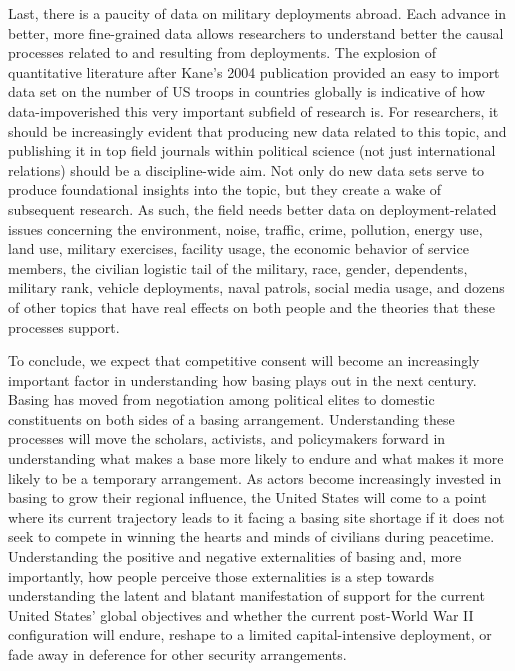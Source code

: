 Last, there is a paucity of data on military deployments abroad. Each advance in better, more fine-grained data allows researchers to understand better the causal processes related to and resulting from deployments. The explosion of quantitative literature after Kane's 2004 publication provided an easy to import data set on the number of US troops in countries globally is indicative of how data-impoverished this very important subfield of research is.\cite{Kane2004} For researchers, it should be increasingly evident that producing new data related to this topic, and publishing it in top field journals within political science (not just international relations) should be a discipline-wide aim. Not only do new data sets serve to produce foundational insights into the topic, but they create a wake of subsequent research. As such, the field needs better data on deployment-related issues concerning the environment, noise, traffic, crime, pollution, energy use, land use, military exercises, facility usage, the economic behavior of service members, the civilian logistic tail of the military, race, gender, dependents, military rank, vehicle deployments, naval patrols, social media usage, and dozens of other topics that have real effects on both people and the theories that these processes support. 



To conclude, we expect that competitive consent will become an increasingly important factor in understanding how basing plays out in the next century. Basing has moved from negotiation among political elites to domestic constituents on both sides of a basing arrangement. Understanding these processes will move the scholars, activists, and policymakers forward in understanding what makes a base more likely to endure and what makes it more likely to be a temporary arrangement. As actors become increasingly invested in basing to grow their regional influence, the United States will come to a point where its current trajectory leads to it facing a basing site shortage if it does not seek to compete in winning the hearts and minds of civilians during peacetime. Understanding the positive and negative externalities of basing and, more importantly, how people perceive those externalities is a step towards understanding the latent and blatant manifestation of support for the current United States' global objectives and whether the current post-World War II configuration will endure, reshape to a limited capital-intensive deployment, or fade away in deference for other security arrangements.
